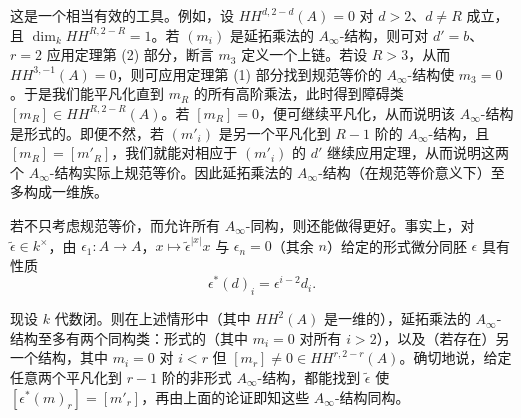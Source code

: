 

这是一个相当有效的工具。例如，设 $HH^{d,2-d}(A)=0$ 对 $d>2$、$d\neq R$ 成立，且 $\dim_kHH^{R,2-R}=1$。若 $(m_i)$ 是延拓乘法的 $A_\infty$-结构，则可对 $d'=b$、$r=2$ 应用定理第 (2) 部分，断言 $m_3$ 定义一个上链。若设 $R>3$，从而 $HH^{3,-1}(A)=0$，则可应用定理第 (1) 部分找到规范等价的 $A_\infty$-结构使 $m_3=0$。于是我们能平凡化直到 $m_R$ 的所有高阶乘法，此时得到障碍类 $[m_R]\in HH^{R,2-R}(A)$。若 $[m_R]=0$，便可继续平凡化，从而说明该 $A_\infty$-结构是形式的。即便不然，若 $(m'_i)$ 是另一个平凡化到 $R-1$ 阶的 $A_\infty$-结构，且 $[m_R]=[m'_R]$，我们就能对相应于 $(m'_i)$ 的 $d'$ 继续应用定理，从而说明这两个 $A_\infty$-结构实际上规范等价。因此延拓乘法的 $A_\infty$-结构（在规范等价意义下）至多构成一维族。


若不只考虑规范等价，而允许所有 $A_\infty$-同构，则还能做得更好。事实上，对 $\tilde\epsilon\in k^{\times}$，由 $\epsilon_1:A\to A$，$x\mapsto\tilde\epsilon^{|x|}x$ 与 $\epsilon_n=0$（其余 $n$）给定的形式微分同胚 $\epsilon$ 具有性质
\[
\epsilon^*(d)_i=\epsilon^{i-2}d_i .
\]


现设 $k$ 代数闭。则在上述情形中（其中 $HH^{2}(A)$ 是一维的），延拓乘法的 $A_\infty$-结构至多有两个同构类：形式的（其中 $m_i=0$ 对所有 $i>2$），以及（若存在）另一个结构，其中 $m_i=0$ 对 $i<r$ 但 $[m_r]\neq0\in HH^{r,2-r}(A)$。确切地说，给定任意两个平凡化到 $r-1$ 阶的非形式 $A_\infty$-结构，都能找到 $\tilde\epsilon$ 使 $[\epsilon^*(m)_r]=[m'_r]$，再由上面的论证即知这些 $A_\infty$-结构同构。

